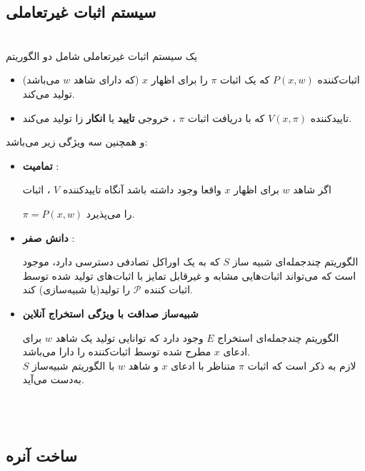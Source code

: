 \subsection{سیستم اثبات غیرتعاملی }\label{non-pf}
\\
یک سیستم اثبات غیرتعاملی شامل دو الگوریتم 
\begin{itemize}
	
\item
 اثبات‌کننده 
$P(x,w)$
که یک اثبات
$\pi$
را برای اظهار 
$x$
(که دارای شاهد
$w$
می‌باشد) تولید می‌کند. 

\item
 تاییدکننده 
$V(x,\pi)$
که با دریافت اثبات
$\pi$
، خروجی
\textbf{تایید}
یا
\textbf{انکار}
زا تولید می‌کند.
\end{itemize}
و همچنین سه ویژگی زیر می‌باشد:
\begin{itemize}
	
\item[]{\bf تمامیت} :
	
‌اگر شاهد 
$w$
برای اظهار
$x$
واقعا وجود داشته باشد آنگاه تاییدکننده 
$V$
، اثبات
 
$\pi = P(x,w)$
را می‌پذیرد. 
	
\item[]{\bf دانش صفر} :
	
 الگوریتم چندجمله‌ای شبیه ساز 
$S$
که به یک اوراکل تصادفی دسترسی دارد، موجود است که می‌تواند اثبات‌هایی مشابه و غیرقابل تمایز با اثبات‌های تولید شده توسط اثبات کننده
$\mathcal{P}$
 را تولید(یا شبیه‌سازی) کند.
\item[]{\bf شبیه‌ساز صداقت با ویژگی استخراج آنلاین }
	
 الگوریتم چندجمله‌ای استخراج
$E$
وجود دارد که توانایی تولید یک شاهد 
$w$
برای ادعای 
$x$
مطرح شده توسط اثبات‌کننده  را دارا می‌باشد.
\\
لازم به ذکر است که اثبات
$\pi$
متناظر با ادعای
$x$
و شاهد
$w$
با الگوریتم شبیه‌ساز
$S$
به‌دست می‌آید.
\end{itemize}~
\\
\\
\subsection{ساخت آنره}\label{unruh_constuction}

